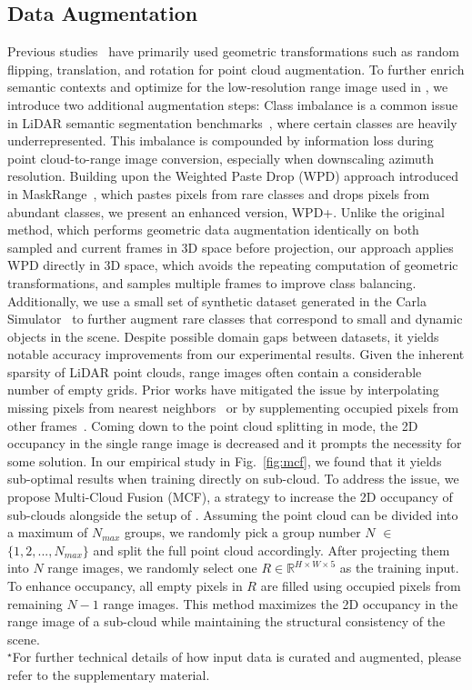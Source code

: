 \subsection{Data Augmentation}
\label{subsec:da}
Previous studies~\cite{cheng2022cenet, ando2023rangevit, zhao2021fidnet} have primarily used geometric transformations such as random flipping, translation, and rotation for point cloud augmentation. To further enrich semantic contexts and optimize for the low-resolution range image used in \coolname{}, we introduce two additional augmentation steps:
 Class imbalance is a common issue in LiDAR semantic segmentation benchmarks~\cite{behley2019semantickitti, caesar2020nuscenes}, where certain classes are heavily underrepresented. This imbalance is compounded by information loss during point cloud-to-range image conversion, especially when downscaling azimuth resolution. Building upon the Weighted Paste Drop (WPD) approach introduced in MaskRange~\cite{gu2022maskrange}, which pastes pixels from rare classes and drops pixels from abundant classes, we present an enhanced version, WPD+. Unlike the original method, which performs geometric data augmentation identically on both sampled and current frames in 3D space before projection, our approach applies WPD directly in 3D space, which avoids the repeating computation of geometric transformations, and samples multiple frames to improve class balancing. Additionally, we use a small set of synthetic dataset generated in the Carla Simulator~\cite{dosovitskiy2017carla} to further augment rare classes that correspond to small and dynamic objects in the scene. Despite possible domain gaps between datasets, it yields notable accuracy improvements from our experimental results. 
 Given the inherent sparsity of LiDAR point clouds, range images often contain a considerable number of empty grids. Prior works have mitigated the issue by interpolating missing pixels from nearest neighbors~\cite{xu2023frnet} or by supplementing occupied pixels from other frames~\cite{kong2023rethinking}. Coming down to the point cloud splitting in \coolname{} mode, the 2D occupancy in the single range image is decreased and it prompts the necessity for some solution. In our empirical study in Fig.~\ref{fig:mcf}, we found that it yields sub-optimal results when training directly on sub-cloud. To address the issue, we propose Multi-Cloud Fusion (MCF), a strategy to increase the 2D occupancy of sub-clouds alongside the setup of \coolname{}. Assuming the point cloud can be divided into a maximum of \(N_{max}\) groups, we randomly pick a group number \(N\) $\in$ \(\{1, 2, ..., N_{max}\}\) and split the full point cloud accordingly. After projecting them into \(N\) range images, we randomly select one \(R \in \mathbb{R}^{H \times W \times 5}\) as the training input. To enhance occupancy, all empty pixels in \(R\) are filled using occupied pixels from remaining \(N-1\) range images. This method maximizes the 2D occupancy in the range image of a sub-cloud while maintaining the structural consistency of the scene. \\
$^\star$For further technical details of how input data is curated and augmented, please refer to the supplementary material.



